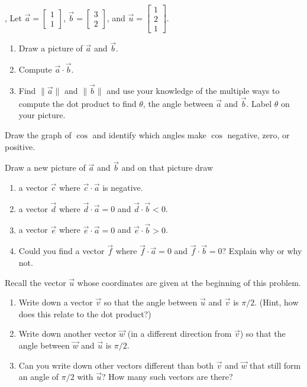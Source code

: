 \documentclass[letter]{article}
\begin{document}
	\pagebreak
	\sep
		Let $\vec a=\begin{bmatrix}1\\1\end{bmatrix}$, $\vec b=\begin{bmatrix}3\\2\end{bmatrix}$, and $\vec u=\begin{bmatrix}1\\2\\1\end{bmatrix}$.
	\vspace{-.5cm}
	\begin{Enum}
		\item 
		\begin{enumerate}	
			\item Draw a picture of $\vec a $ and $\vec b$.
			\item Compute $\vec a\cdot \vec b$.
			\item Find $\|\vec a\|$ and $\|\vec b\|$ and use your knowledge of
			the multiple ways to compute the dot product to find $\theta$,
			the angle between $\vec a$ and $\vec b$. Label $\theta$ on your picture.
		\end{enumerate}
		\item Draw the graph of $\cos$ and identify which angles make $\cos$ negative, zero,
		or positive.

		\item Draw a new picture of $\vec a$ and $\vec b$ and on that picture draw
		\begin{enumerate}	
			\item a vector $\vec c$ where $\vec c\cdot \vec a$ is negative.
			\item a vector $\vec d$ where $\vec d\cdot \vec a=0$ and $\vec d\cdot \vec b < 0$.
			\item a vector $\vec e$ where $\vec e\cdot \vec a=0$ and $\vec e\cdot \vec b>0$.
			\item Could you find a vector $\vec f$ where $\vec f\cdot \vec a=0$ and $\vec f\cdot \vec b=0$?
			Explain why or why not.
		\end{enumerate}

		\item Recall the vector $\vec u$ whose coordinates are given at the beginning of this problem.
		\begin{enumerate}
			\item Write down a vector $\vec v$ so that the angle between $\vec u$ and $\vec v$
			is $\pi/2$. (Hint, how does this relate to the dot product?)
			\item Write down another vector $\vec w$ (in a different direction from $\vec v$)
			so that the angle between $\vec w$ and $\vec u$ is $\pi/2$.
			\item Can you write down other vectors different than both $\vec v$ and $\vec w$ that still
			form an angle of $\pi/2$ with $\vec u$?  How many such vectors are there?
		\end{enumerate}
	\end{Enum}
\end{document}
